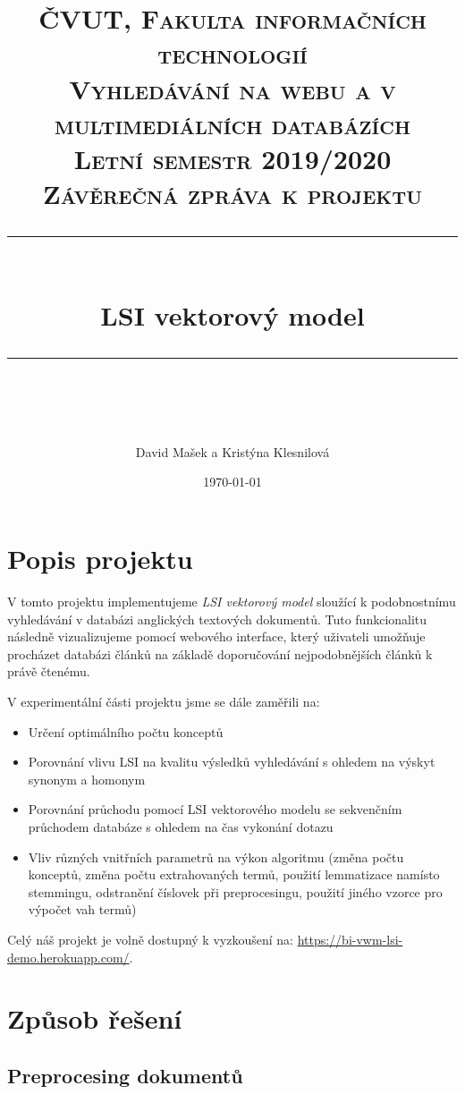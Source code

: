 \documentclass[11pt]{scrartcl} %
\title{	
	\normalfont\normalsize
	\textsc{ČVUT, Fakulta informačních technologií}\\ %
	\textsc{Vyhledávání na webu a v multimediálních databázích}\\
	\textsc{Letní semestr 2019/2020}\\
	\textsc{Závěrečná zpráva k projektu}\\
	\vspace{25pt} %
	\rule{\linewidth}{0.5pt}\\ %
	\vspace{20pt} %
	{\huge LSI vektorový model}\\ %
	\vspace{12pt} %
	\rule{\linewidth}{2pt}\\ %
	\vspace{12pt} %
}
\author{\LARGE David Mašek a Kristýna Klesnilová} %
\date{\normalsize\today} %
\begin{document}
\maketitle %

\newpage

\tableofcontents

\newpage

\section{Popis projektu}

V tomto projektu implementujeme \emph{LSI vektorový model} sloužící k podobnostnímu vyhledávání v databázi anglických textových dokumentů. Tuto funkcionalitu následně vizualizujeme pomocí webového interface, který uživateli umožňuje procházet databázi článků na základě doporučování nejpodobnějších článků k právě čtenému.

\bigskip 

V experimentální části projektu jsme se dále zaměřili na:
\begin{itemize}
	\item Určení optimálního počtu konceptů
	\item Porovnání vlivu LSI na kvalitu výsledků vyhledávání s ohledem na výskyt synonym a homonym
	\item Porovnání průchodu pomocí LSI vektorového modelu se sekvenčním průchodem databáze s ohledem na čas vykonání dotazu
	\item Vliv různých vnitřních parametrů na výkon algoritmu (změna počtu konceptů, změna počtu extrahovaných termů, použití lemmatizace namísto stemmingu, odstranění číslovek při preprocesingu, použití jiného vzorce pro výpočet vah termů)
\end{itemize}

\bigskip 

Celý náš projekt je volně dostupný k vyzkoušení na: \url{https://bi-vwm-lsi-demo.herokuapp.com/}.

\section{Způsob řešení}

\subsection{Preprocesing dokumentů}
\end{document}
